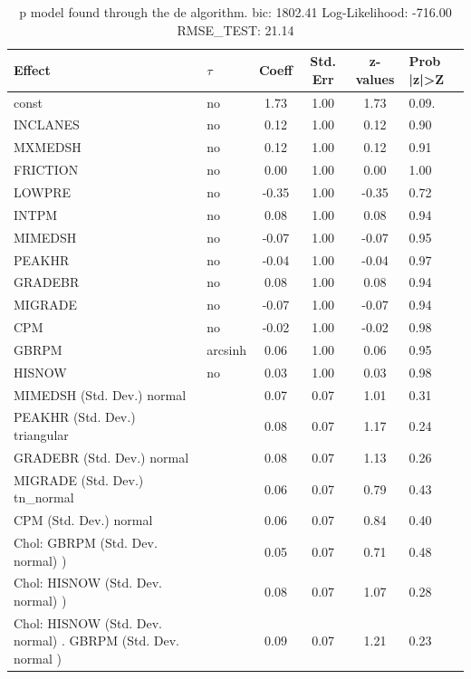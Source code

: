\begin{table}
	\caption{p model found through the de algorithm. bic: 1802.41 Log-Likelihood: -716.00 RMSE_TEST: 21.14}
	\begin{center}
		\begin{tabular}{|l|l|c|c|c|l|}
			\hline
			Effect & $\tau$ & Coeff & Std. Err & z-values & Prob |z|>Z \\
			\hline
			const & no & 1.73 & 1.00 & 1.73 & 0.09. \\
			\hline
			INCLANES & no & 0.12 & 1.00 & 0.12 & 0.90 \\
			\hline
			MXMEDSH & no & 0.12 & 1.00 & 0.12 & 0.91 \\
			\hline
			FRICTION & no & 0.00 & 1.00 & 0.00 & 1.00 \\
			\hline
			LOWPRE & no & -0.35 & 1.00 & -0.35 & 0.72 \\
			\hline
			INTPM & no & 0.08 & 1.00 & 0.08 & 0.94 \\
			\hline
			MIMEDSH & no & -0.07 & 1.00 & -0.07 & 0.95 \\
			\hline
			PEAKHR & no & -0.04 & 1.00 & -0.04 & 0.97 \\
			\hline
			GRADEBR & no & 0.08 & 1.00 & 0.08 & 0.94 \\
			\hline
			MIGRADE & no & -0.07 & 1.00 & -0.07 & 0.94 \\
			\hline
			CPM & no & -0.02 & 1.00 & -0.02 & 0.98 \\
			\hline
			GBRPM & arcsinh & 0.06 & 1.00 & 0.06 & 0.95 \\
			\hline
			HISNOW & no & 0.03 & 1.00 & 0.03 & 0.98 \\
			\hline
			MIMEDSH (Std. Dev.) normal &  & 0.07 & 0.07 & 1.01 & 0.31 \\
			\hline
			PEAKHR (Std. Dev.) triangular &  & 0.08 & 0.07 & 1.17 & 0.24 \\
			\hline
			GRADEBR (Std. Dev.) normal &  & 0.08 & 0.07 & 1.13 & 0.26 \\
			\hline
			MIGRADE (Std. Dev.) tn_normal &  & 0.06 & 0.07 & 0.79 & 0.43 \\
			\hline
			CPM (Std. Dev.) normal &  & 0.06 & 0.07 & 0.84 & 0.40 \\
			\hline
			 Chol: GBRPM (Std. Dev. normal) ) &  & 0.05 & 0.07 & 0.71 & 0.48 \\
			\hline
			 Chol: HISNOW (Std. Dev. normal) ) &  & 0.08 & 0.07 & 1.07 & 0.28 \\
			\hline
			 Chol: HISNOW (Std. Dev. normal) . GBRPM (Std. Dev.   normal ) &  & 0.09 & 0.07 & 1.21 & 0.23 \\
			\hline
		\end{tabular}
	\end{center}
\end{table}
